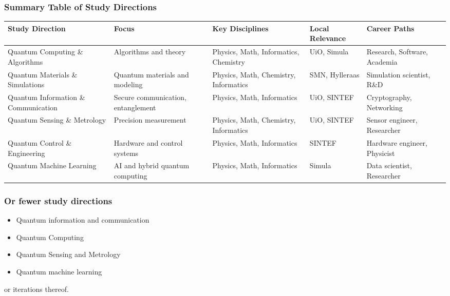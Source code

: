 \documentclass{beamer}
\begin{document}
\begin{frame}
\frametitle{Summary Table of Study Directions}
\footnotesize{
\begin{center}
\begin{tabular}{p{3.5cm}p{3cm}p{3cm}p{3cm}p{3cm}}
\toprule
\textbf{Study Direction} & \textbf{Focus} & \textbf{Key Disciplines} & \textbf{Local Relevance} & \textbf{Career Paths} \\
\midrule
Quantum Computing \& Algorithms & Algorithms and theory & Physics, Math, Informatics, Chemistry & UiO, Simula & Research, Software, Academia \\
Quantum Materials \& Simulations & Quantum materials and modeling & Physics, Math, Chemistry, Informatics & SMN, Hylleraas & Simulation scientist, R\&D \\
Quantum Information \& Communication & Secure communication, entanglement & Physics, Math, Informatics & UiO, SINTEF & Cryptography, Networking \\
Quantum Sensing \& Metrology & Precision measurement & Physics, Math, Chemistry, Informatics & UiO, SINTEF & Sensor engineer, Researcher \\
Quantum Control \& Engineering & Hardware and control systems & Physics, Math, Informatics & SINTEF & Hardware engineer, Physicist \\
Quantum Machine Learning & AI and hybrid quantum computing & Physics, Math, Informatics & Simula & Data scientist, Researcher \\
\bottomrule
\end{tabular}
\end{center}
}
\end{frame}

\begin{frame}
\frametitle{Or fewer study directions}
\begin{itemize}
\item Quantum information and communication
\item Quantum Computing
\item Quantum Sensing and Metrology
\item Quantum machine learning
\end{itemize}
or iterations thereof.
\end{frame}
\end{document}
